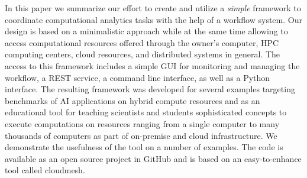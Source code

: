 
In this paper we summarize our effort to create and utilize a {\em simple} framework to coordinate computational analytics tasks with the help of a workflow system. Our design is based on a minimalistic approach while at the same time allowing to access computational resources offered through the owner's computer, HPC computing centers, cloud resources, and distributed systems in general. The access to this framework includes a simple GUI for monitoring and managing the workflow, a REST service, a command line interface, as well as a Python interface. The resulting framework was developed for several examples targeting benchmarks of AI applications on hybrid compute resources and as an educational tool for teaching scientists and students sophisticated concepts to execute computations on resources ranging from a single computer to many thousands of computers as part of on-premise and cloud infrastructure. We demonstrate the usefulness of the tool on a number of examples. The code is available as an open source project in GitHub and is based on an easy-to-enhance tool called cloudmesh.